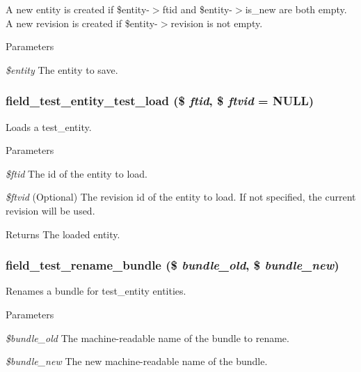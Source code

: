 A new entity is created if \$entity-\/$>$ftid and \$entity-\/$>$is\_\-new are both empty. A new revision is created if \$entity-\/$>$revision is not empty.


\begin{DoxyParams}{Parameters}
\item[{\em \$entity}]The entity to save. \end{DoxyParams}
\hypertarget{field__test_8entity_8inc_a5930250cf03c656cee13f8aaf849cf22}{
\subsubsection[{field\_\-test\_\-entity\_\-test\_\-load}]{\setlength{\rightskip}{0pt plus 5cm}field\_\-test\_\-entity\_\-test\_\-load (\$ {\em ftid}, \/  \$ {\em ftvid} = {\ttfamily NULL})}}
\label{field__test_8entity_8inc_a5930250cf03c656cee13f8aaf849cf22}
Loads a test\_\-entity.


\begin{DoxyParams}{Parameters}
\item[{\em \$ftid}]The id of the entity to load. \item[{\em \$ftvid}](Optional) The revision id of the entity to load. If not specified, the current revision will be used. \end{DoxyParams}
\begin{DoxyReturn}{Returns}
The loaded entity. 
\end{DoxyReturn}
\hypertarget{field__test_8entity_8inc_a06a99d57d5a95dab9eb045b50aca418b}{
\subsubsection[{field\_\-test\_\-rename\_\-bundle}]{\setlength{\rightskip}{0pt plus 5cm}field\_\-test\_\-rename\_\-bundle (\$ {\em bundle\_\-old}, \/  \$ {\em bundle\_\-new})}}
\label{field__test_8entity_8inc_a06a99d57d5a95dab9eb045b50aca418b}
Renames a bundle for test\_\-entity entities.


\begin{DoxyParams}{Parameters}
\item[{\em \$bundle\_\-old}]The machine-\/readable name of the bundle to rename. \item[{\em \$bundle\_\-new}]The new machine-\/readable name of the bundle. \end{DoxyParams}
